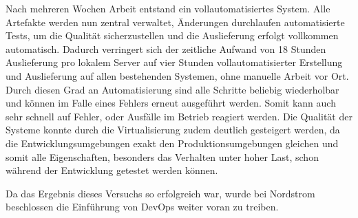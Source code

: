 Nach mehreren Wochen Arbeit entstand ein vollautomatisiertes System. 
Alle Artefakte werden nun zentral verwaltet, Änderungen durchlaufen automatisierte Tests, um die Qualität sicherzustellen und die Auslieferung erfolgt vollkommen automatisch. 
Dadurch verringert sich der zeitliche Aufwand von 18 Stunden Auslieferung pro lokalem Server auf vier Stunden vollautomatisierter Erstellung und Auslieferung auf allen bestehenden Systemen, ohne manuelle Arbeit vor Ort. 
Durch diesen Grad an Automatisierung sind alle Schritte beliebig wiederholbar und können im Falle eines Fehlers erneut ausgeführt werden. 
Somit kann auch sehr schnell auf Fehler, oder Ausfälle im Betrieb reagiert werden. 
Die Qualität der Systeme konnte durch die Virtualisierung zudem deutlich gesteigert werden, da die Entwicklungsumgebungen exakt den Produktionsumgebungen gleichen und somit alle Eigenschaften, besonders das Verhalten unter hoher Last, schon während der Entwicklung getestet werden können. 
\parencite[Vgl.][S. 6]{Reed:2014}

Da das Ergebnis dieses Versuchs so erfolgreich war, wurde bei Nordstrom beschlossen die Einführung von DevOps weiter voran zu treiben. \parencite[Vgl.][S. 14]{Reed:2014}
